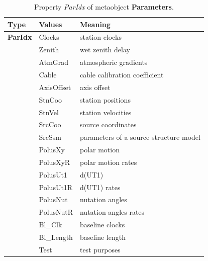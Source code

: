 \documentclass [10pt,letterpaper]{report}
\begin{document}
\begin{table}[htb]
\centering
\footnotesize
\begin{tabular}{llp{}}
\hline
Type & Values & Meaning\\
\hline
  {\bf ParIdx}  & Clocks & station clocks\\
            & Zenith & wet zenith delay\\
            & AtmGrad & atmospheric gradients\\
            & Cable & cable calibration coefficient \\
            & AxisOffset & axis offset\\
            & StnCoo & station positions \\
            & StnVel & station velocities\\
            & SrcCoo & source coordinates\\
            & SrcSsm & parameters of a source structure model\\
            & PolusXy & polar motion \\
            & PolusXyR & polar motion rates \\
            & PolusUt1 & d(UT1) \\
            & PolusUt1R & d(UT1) rates \\
            & PolusNut & nutation angles \\
            & PolusNutR & nutation angles rates \\
            & Bl\_Clk & baseline clocks \\
            & Bl\_Length & baseline length \\
            & Test & test purposes \\
\hline
\end{tabular}
\caption{Property {\sl ParIdx} of metaobject {\bf Parameters}.}
\label{tab-scr-pardesc-properties-2}
\end{table}
\end{document}
